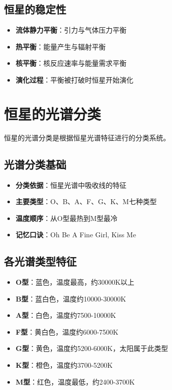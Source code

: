 \documentclass[12pt,UTF8]{ctexbook}
\begin{document}
\subsection{恒星的稳定性}

\begin{itemize}
  \item \textbf{流体静力平衡}：引力与气体压力平衡
  \item \textbf{热平衡}：能量产生与辐射平衡
  \item \textbf{核平衡}：核反应速率与能量需求平衡
  \item \textbf{演化过程}：平衡被打破时恒星开始演化
\end{itemize}

\section{恒星的光谱分类}

恒星的光谱分类是根据恒星光谱特征进行的分类系统。

\subsection{光谱分类基础}

\begin{itemize}
  \item \textbf{分类依据}：恒星光谱中吸收线的特征
  \item \textbf{主要类型}：O、B、A、F、G、K、M七种类型
  \item \textbf{温度顺序}：从O型最热到M型最冷
  \item \textbf{记忆口诀}：Oh Be A Fine Girl, Kiss Me
\end{itemize}

\subsection{各光谱类型特征}

\begin{itemize}
  \item \textbf{O型}：蓝色，温度最高，约30000K以上
  \item \textbf{B型}：蓝白色，温度约10000-30000K
  \item \textbf{A型}：白色，温度约7500-10000K
  \item \textbf{F型}：黄白色，温度约6000-7500K
  \item \textbf{G型}：黄色，温度约5200-6000K，太阳属于此类型
  \item \textbf{K型}：橙色，温度约3700-5200K
  \item \textbf{M型}：红色，温度最低，约2400-3700K
\end{itemize}
\end{document}
